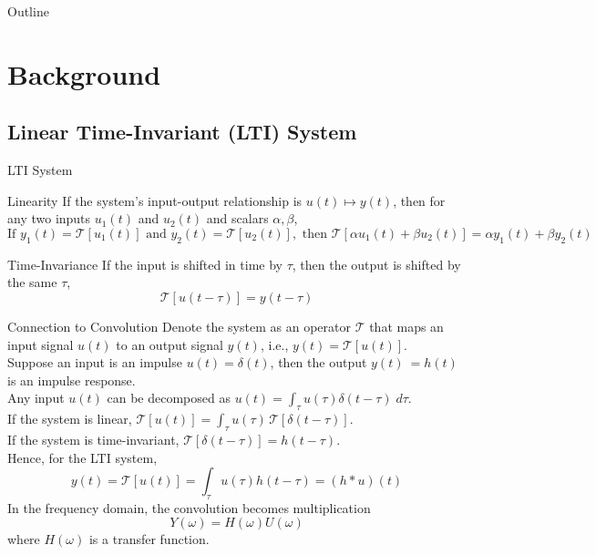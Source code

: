 \documentclass[xcolor=dvipsnames,aspectratio=169]{beamer}
\title{\TalkTitle}
\author{\TalkAuthor}
\institute{\TalkInstitute}
\date{\TalkDate}
\begin{document}
    \begin{frame}
        \titlepage
    \end{frame}
    
    \begin{frame}{Outline}
        \tableofcontents
    \end{frame}

    \section{Background}
        \subsection{Linear Time-Invariant (LTI) System}
            \begin{frame}{LTI System}
                \begin{block}{Linearity}
                    If the system's input-output relationship is $u(t) \mapsto y(t)$, then for any two inputs $u_{1} (t)$ and $u_{2} (t)$ and scalars $\alpha, \beta$, 
                    $$\text{If } y_1(t) = \mathcal{T}[u_1(t)] \text{ and } y_2(t) = \mathcal{T}[u_2(t)], \text{ then }\mathcal{T}[\alpha u_1(t) + \beta u_2(t)] = \alpha y_1(t) + \beta y_2(t)$$
                \end{block}

                \begin{block}{Time-Invariance}
                    If the input is shifted in time by $\tau$, then the output is shifted by the same $\tau$,
                    $$\mathcal{T}[u(t - \tau)] = y(t - \tau)$$
                \end{block}
            \end{frame}

            \begin{frame}{Connection to Convolution}
                \small
                Denote the system as an operator $\mathcal{T}$ that maps an input signal $u(t)$ to an output signal $y(t)$, i.e., $y(t) = \mathcal{T}[u(t)]$. \\
                Suppose an input is an impulse $u(t) = \delta(t)$, then the output $y(t) \ = h(t)$ is an impulse response. \\
                Any input $u(t)$ can be decomposed as $u(t) = \int_{\tau} u(\tau) \delta (t - \tau) \; d\tau$. \\
                If the system is linear, $\mathcal{T}[u(t)] = \int_{\tau} u(\tau)\, \mathcal{T}[\delta(t - \tau)]$. \\
                If the system is time-invariant, $\mathcal{T}[\delta(t - \tau)] = h(t - \tau)$. \\
                Hence, for the LTI system, 
                $$y(t) = \mathcal{T}[u(t)] = \int_{\tau} u(\tau) h(t - \tau) = (h * u)(t)$$
                In the frequency domain, the convolution becomes multiplication 
                $$Y(\omega) = H(\omega) U(\omega)$$ 
                where $H(\omega)$ is a transfer function.
            \end{frame}
\end{document}
